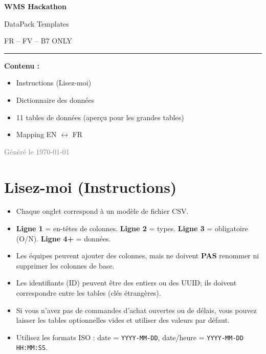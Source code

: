 \documentclass[a4paper,11pt]{article}
\begin{document}
\begin{titlepage}
\centering
\vspace*{3cm}
{\Huge\bfseries\textcolor{titleblue}{WMS Hackathon}\par}
\vspace{0.8cm}
{\LARGE\textcolor{sectionblue}{DataPack Templates}\par}
\vspace{0.5cm}
{\Large FR -- FV -- B7 ONLY\par}
\vspace{2cm}
\textcolor{sectionblue}{\rule{0.6\textwidth}{1.5pt}}
\vspace{1.5cm}

{\large\textbf{Contenu :}\par}
\vspace{0.5cm}
\begin{itemize}\setlength{\itemsep}{2pt}
    \item[\textcolor{sectionblue}{$\bullet$}] Instructions (Lisez-moi)
    \item[\textcolor{sectionblue}{$\bullet$}] Dictionnaire des données
    \item[\textcolor{sectionblue}{$\bullet$}] 11 tables de données (aperçu pour les grandes tables)
    \item[\textcolor{sectionblue}{$\bullet$}] Mapping EN $\leftrightarrow$ FR
\end{itemize}
\vfill
{\small\textcolor{gray}{Généré le \today}\par}
\end{titlepage}

\tableofcontents
\newpage


\section{Lisez-moi (Instructions)}

\begin{itemize}
    \item Chaque onglet correspond à un modèle de fichier CSV.
    \item \textbf{Ligne 1} = en-têtes de colonnes. \textbf{Ligne 2} = types. \textbf{Ligne 3} = obligatoire (O/N). \textbf{Ligne 4+} = données.
    \item Les équipes peuvent ajouter des colonnes, mais ne doivent \textbf{PAS} renommer ni supprimer les colonnes de base.
    \item Les identifiants (ID) peuvent être des entiers ou des UUID; ils doivent correspondre entre les tables (clés étrangères).
    \item Si vous n'avez pas de commandes d'achat ouvertes ou de délais, vous pouvez laisser les tables optionnelles vides et utiliser des valeurs par défaut.
    \item Utilisez les formats ISO : date = \texttt{YYYY-MM-DD}, date/heure = \texttt{YYYY-MM-DD HH:MM:SS}.
\end{itemize}
\end{document}
